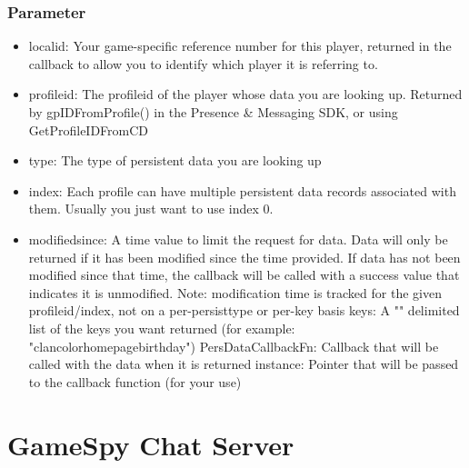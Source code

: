 \documentclass[oneside,titlepage,a4paper]{Definition/retrospy} %
\begin{document}
\section{Parameter}
\begin{itemize}
	\item localid: Your game-specific reference number for this player, returned in the callback
	to allow you to identify which player it is referring to.
	\item profileid: The profileid of the player whose data you are looking up. 
	Returned by gpIDFromProfile() in the Presence \& Messaging SDK, or using GetProfileIDFromCD
\item	type: The type of persistent data you are looking up
\item	index: Each profile can have multiple persistent data records associated with them. Usually you
	just want to use index 0.
\item	modifiedsince: A time value to limit the request for data. Data will only be returned if it has been
	modified since the time provided. If data has not been modified since that time, the callback will be
	called with a success value that indicates it is unmodified.
Note: modification time is tracked for the given profileid/index, not on a per-persisttype or per-key basis
	keys: A "\tbs" delimited list of the keys you want returned (for example: "\tbs clan\tbs color\tbs homepage\tbs birthday")
	PersDataCallbackFn: Callback that will be called with the data when it is returned
	instance: Pointer that will be passed to the callback function (for your use)
\end{itemize}




\part{GameSpy Chat Server}
\end{document}
